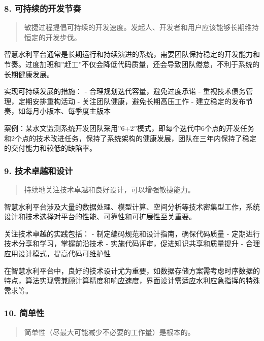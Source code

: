 \subsubsection{8.
可持续的开发节奏}\label{ux53efux6301ux7eedux7684ux5f00ux53d1ux8282ux594f}

\begin{quote}
敏捷过程提倡可持续的开发速度。发起人、开发者和用户应该能够长期维持恒定的开发步伐。
\end{quote}

智慧水利平台通常是长期运行和持续演进的系统，需要团队保持稳定的开发能力和节奏。过度加班和''赶工''不仅会降低代码质量，还会导致团队倦怠，不利于系统的长期健康发展。

实现可持续发展的措施： - 合理规划迭代容量，避免过度承诺 -
重视技术债务管理，定期安排重构活动 - 关注团队健康，避免长期高压工作 -
建立稳定的发布节奏，如每月小版本、每季度主版本

案例：某水文监测系统开发团队采用''6+2''模式，即每个迭代中6个点的开发任务和2个点的技术改进任务，保持了系统架构的健康发展，团队在三年内保持了稳定的交付能力和较低的缺陷率。

\subsubsection{9.
技术卓越和设计}\label{ux6280ux672fux5353ux8d8aux548cux8bbeux8ba1}

\begin{quote}
持续地关注技术卓越和良好设计，可以增强敏捷能力。
\end{quote}

智慧水利平台涉及大量的数据处理、模型计算、空间分析等技术密集型工作，系统设计和技术选择对平台的性能、可靠性和可扩展性至关重要。

关注技术卓越的实践包括： - 制定编码规范和设计指南，确保代码质量 -
定期进行技术分享和学习，掌握前沿技术 -
实施代码评审，促进知识共享和质量提升 -
合理应用设计模式，提高代码可维护性

在智慧水利平台中，良好的技术设计尤为重要，如数据存储方案需考虑时序数据的特点，算法实现需兼顾计算精度和响应速度，界面设计需适应水利应急指挥的特殊需求等。

\subsubsection{10. 简单性}\label{ux7b80ux5355ux6027}

\begin{quote}
简单性（尽最大可能减少不必要的工作量）是根本的。
\end{quote}

